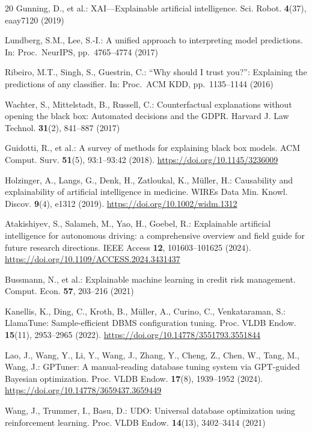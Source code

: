 \documentclass[iicol,pdflatex,sn-mathphys-num]{sn-jnl}
\theoremstyle{thmstyleone}
\theoremstyle{thmstylethree}
\begin{document}
\begin{thebibliography}{20}
Gunning, D., et al.: XAI---Explainable artificial intelligence. Sci.
Robot. \textbf{4}(37), eaay7120 (2019)

Lundberg, S.M., Lee, S.-I.: A unified approach to interpreting model
predictions. In: Proc.\ NeurIPS, pp.\ 4765--4774 (2017)

Ribeiro, M.T., Singh, S., Guestrin, C.: ``Why should I trust you?'':
Explaining the predictions of any classifier. In: Proc.\ ACM KDD, pp.\
1135--1144 (2016)

Wachter, S., Mittelstadt, B., Russell, C.: Counterfactual explanations
without opening the black box: Automated decisions and the GDPR.
Harvard J. Law Technol. \textbf{31}(2), 841--887 (2017)

Guidotti, R., et al.: A survey of methods for explaining black box
models. ACM Comput. Surv. \textbf{51}(5), 93:1--93:42 (2018).
\url{https://doi.org/10.1145/3236009}

Holzinger, A., Langs, G., Denk, H., Zatloukal, K., M\"uller, H.:
Causability and explainability of artificial intelligence in
medicine. WIREs Data Min. Knowl. Discov. \textbf{9}(4), e1312 (2019).
\url{https://doi.org/10.1002/widm.1312}

Atakishiyev, S., Salameh, M., Yao, H., Goebel, R.: Explainable
artificial intelligence for autonomous driving: a comprehensive
overview and field guide for future research directions. IEEE
Access \textbf{12}, 101603--101625 (2024).
\url{https://doi.org/10.1109/ACCESS.2024.3431437}

Bussmann, N., et al.: Explainable machine learning in credit risk
management. Comput. Econ. \textbf{57}, 203--216 (2021)

Kanellis, K., Ding, C., Kroth, B., M\"uller, A., Curino, C.,
Venkataraman, S.: LlamaTune: Sample-efficient DBMS configuration
tuning. Proc. VLDB Endow. \textbf{15}(11), 2953--2965 (2022).
\url{https://doi.org/10.14778/3551793.3551844}

Lao, J., Wang, Y., Li, Y., Wang, J., Zhang, Y., Cheng, Z., Chen, W.,
Tang, M., Wang, J.: GPTuner: A manual-reading database tuning system
via GPT-guided Bayesian optimization. Proc. VLDB Endow.
\textbf{17}(8), 1939--1952 (2024).
\url{https://doi.org/10.14778/3659437.3659449}

Wang, J., Trummer, I., Basu, D.: UDO: Universal database optimization
using reinforcement learning. Proc. VLDB Endow. \textbf{14}(13),
3402--3414 (2021)

\end{thebibliography}
\end{document}
